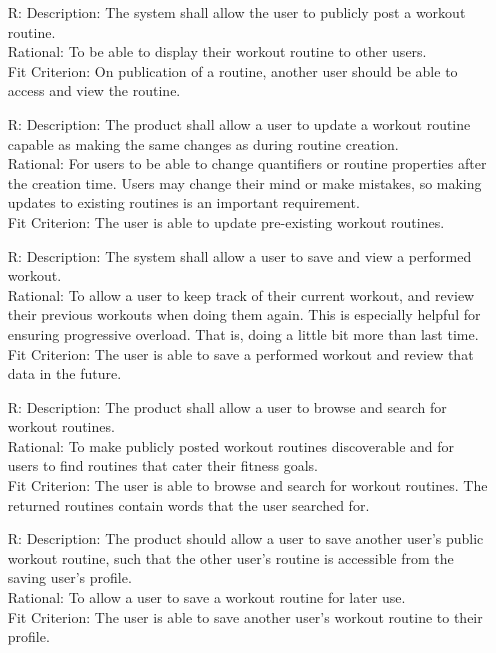 \documentclass[12pt]{article}
\newcounter{reqnum} %
\begin{document}
\begin{itemize}
\item[R\refstepcounter{reqnum}\thereqnum \label{R_Inputs}:]
Description: The system shall allow the user to publicly post a workout routine.
\\ Rational: To be able to display their workout routine to other users.
\\ Fit Criterion: On publication of a routine, another user should be able to access and view the routine.

\item[R\refstepcounter{reqnum}\thereqnum \label{R_Inputs}:]
Description: The product shall allow a user to update a workout routine capable as making the same changes as during routine creation.
\\ Rational: For users to be able to change quantifiers or routine properties after the creation time. Users may change their mind or make mistakes, so making updates to existing routines is an important requirement.
\\ Fit Criterion: The user is able to update pre-existing workout routines.

\item[R\refstepcounter{reqnum}\thereqnum \label{R_Inputs}:]
Description: The system shall allow a user to save and view a performed workout.
\\ Rational: To allow a user to keep track of their current workout, and review their previous workouts when doing them again.
This is especially helpful for ensuring progressive overload. That is, doing a little bit more than last time.
\\ Fit Criterion: The user is able to save a performed workout and review that data in the future.

\item[R\refstepcounter{reqnum}\thereqnum \label{R_Inputs}:]
Description: The product shall allow a user to browse and search for workout routines.
\\ Rational: To make publicly posted workout routines discoverable and for users to find routines that cater their fitness goals.
\\ Fit Criterion: The user is able to browse and search for workout routines. The returned routines contain words that the user searched for.

\item[R\refstepcounter{reqnum}\thereqnum \label{R_Inputs}:]
Description: The product should allow a user to save another user's public workout routine, such that the other user's routine is accessible from the saving user's profile.
\\ Rational: To allow a user to save a workout routine for later use.
\\ Fit Criterion: The user is able to save another user's workout routine to their profile.


\end{itemize}
\end{document}

